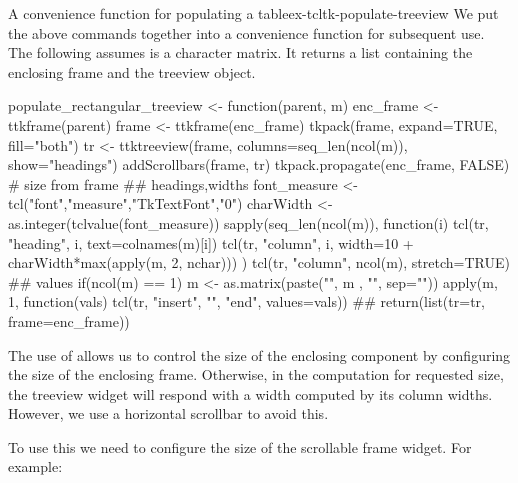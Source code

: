 \begin{example}{A convenience function for populating a table}{ex-tcltk-populate-treeview}
  We put the above commands together into a convenience function for
  subsequent use. The following assumes  is a character
  matrix. It returns a list containing the enclosing frame and the
  treeview object.  
\begin{Schunk}
\begin{Sinput}
 populate_rectangular_treeview <- function(parent, m) {
   enc_frame <- ttkframe(parent)
   frame <- ttkframe(enc_frame)
   tkpack(frame, expand=TRUE, fill="both")
   tr <- ttktreeview(frame,
                     columns=seq_len(ncol(m)),
                     show="headings")
   addScrollbars(frame, tr)
   tkpack.propagate(enc_frame, FALSE)    # size from frame
   ## headings,widths
   font_measure <- tcl("font","measure","TkTextFont","0")
   charWidth <- as.integer(tclvalue(font_measure))
   sapply(seq_len(ncol(m)), function(i) {
     tcl(tr, "heading", i, text=colnames(m)[i])
     tcl(tr, "column", i, 
         width=10 + charWidth*max(apply(m, 2, nchar)))
   })
   tcl(tr, "column", ncol(m), stretch=TRUE)
   ## values
   if(ncol(m) == 1)  m <- as.matrix(paste("{", m , "}", sep=""))
   apply(m, 1, function(vals) 
     tcl(tr, "insert", "", "end", values=vals))
   ##
   return(list(tr=tr, frame=enc_frame))
 }
\end{Sinput}
\end{Schunk}
%
The use of  allows us to control the size of
the enclosing component by configuring the size of the enclosing
frame. Otherwise, in the computation for requested size, the treeview
widget will respond with a width computed by its column
widths. However, we use a horizontal scrollbar to avoid this.

To use this we need to configure the size of the scrollable frame
widget. For example:
\begin{Schunk}
\end{Schunk}

\end{example}



